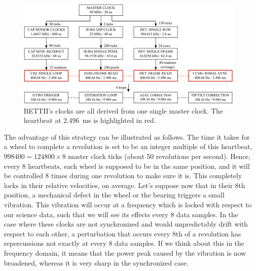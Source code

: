 \begin{figure}[!h]
		\centering
		\includegraphics[width=\textwidth]{Figures/Clocks.pdf} 
		\caption[Clocks]{BETTII's clocks are all derived from one single master clock. The heartbeat at \SI{2.496}{\milli\second} is highlighted in red.}
		\label{fig:Clocks}
\end{figure}


The advantage of this strategy can be illustrated as follows. The time it takes for a wheel to complete a revolution is set to be an integer multiple of this heartbeat, $\num{998400}=\num{124800}\times 8$ master clock ticks (about 50 revolutions per second). Hence, every 8 heartbeats, each wheel is supposed to be in the same position, and it will be controlled 8 times during one revolution to make sure it is. This completely locks in their relative velocities, on average. Let's suppose now that in their 8th position, a mechanical defect in the wheel or the bearing triggers a small vibration. This vibration will occur at a frequency which is locked with respect to our science data, such that we will see its effects every 8 data samples. In the case where these clocks are not synchronized and would unpredictably drift with respect to each other, a perturbation that occurs every 8th of a revolution has repercussions not exactly at every 8 data samples. If we think about this in the frequency domain, it means that the power peak caused by the vibration is now broadened, whereas it is very sharp in the synchronized case.


